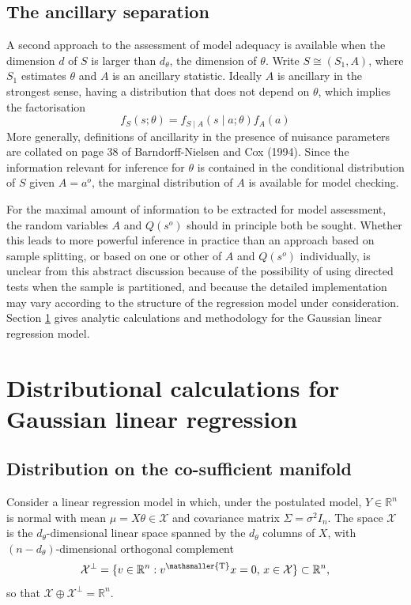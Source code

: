 \documentclass[10pt, reqno]{amsart}
\numberwithin{equation}{section}
\newcommand{\RR}{\mathbb{R}}
\newcommand{\T}{{\mathsmaller {\rm T}}}
\begin{document}
\subsection{The ancillary separation}\label{secAncill}

A second approach to the assessment of model adequacy is available when the dimension $d$ of $S$ is larger than $d_\theta$, the dimension of $\theta$. Write $S\cong (S_1,A)$, where $S_1$ estimates $\theta$ and $A$ is an ancillary statistic. Ideally $A$ is ancillary in the strongest sense, having a distribution that does not depend on $\theta$, which implies the factorisation
%
\begin{equation}\label{eqAncillFact}
	f_{S}(s;\theta)= f_{S\mid A}(s \mid a;\theta)f_A(a)
\end{equation}
%
More generally, definitions of ancillarity in the presence of nuisance parameters are collated on page 38 of Barndorff-Nielsen and Cox (1994). Since the information relevant for inference for $\theta$ is contained in the conditional distribution of $S$ given $A=a^o$, the marginal distribution of $A$ is available for model checking. 

For the maximal amount of information to be extracted for model assessment, the random variables $A$ and $Q(s^o)$ should in principle both be sought. Whether this leads to more powerful inference in practice than an approach based on sample splitting, or based on one or other of $A$ and $Q(s^o)$ individually, is unclear from this abstract discussion because of the possibility of using directed tests when the sample is partitioned, and because the detailed implementation may vary according to the structure of the regression model under consideration. Section \ref{secGL} gives analytic calculations and methodology for the Gaussian linear regression model. 

\section{Distributional calculations for Gaussian linear regression}\label{secGL}

\subsection{Distribution on the co-sufficient manifold}\label{secExplicitGaussian}

Consider a linear regression model in which, under the postulated model, $Y\in \mathbb{R}^n$ is normal with mean $\mu = X\theta \in \mathcal{X}$ and covariance matrix  $\Sigma = \sigma^2 I_n$. The space $\mathcal{X}$ is the $d_\theta$-dimensional linear space spanned by the $d_\theta$ columns of $X$, with $(n-d_\theta)$-dimensional orthogonal complement
\[
\mathcal{X}^\perp = \{v\in \mathbb{R}^n: v^\T x=0,\, x\in \mathcal{X}\}\subset \mathbb{R}^n,
\] 
so that $\mathcal{X}\oplus \mathcal{X}^\perp = \RR^n$.
\end{document}
